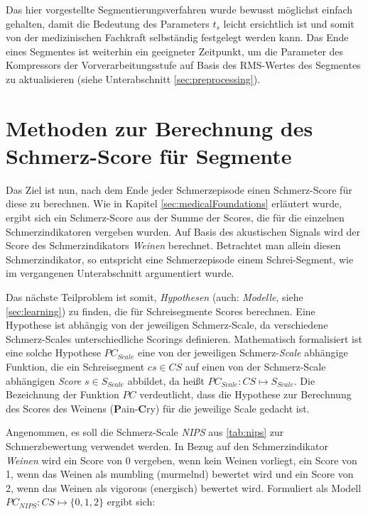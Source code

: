 Das hier vorgestellte Segmentierungsverfahren wurde bewusst möglichst einfach gehalten, damit die Bedeutung des Parameters $t_{s}$ leicht ersichtlich ist und somit von der medizinischen Fachkraft selbständig festgelegt werden kann. Das Ende eines Segmentes ist weiterhin ein geeigneter Zeitpunkt, um die Parameter des Kompressors der Vorverarbeitungsstufe auf Basis des RMS-Wertes des Segmentes zu aktualisieren (siehe Unterabschnitt  \ref{sec:preprocessing}).


\section{Methoden zur Berechnung des Schmerz-Score für Segmente}
\label{sec:overviewPainRegression}

Das Ziel ist nun, nach dem Ende jeder Schmerzepisode einen Schmerz-Score für diese zu berechnen. Wie in Kapitel \ref{sec:medicalFoundations} erläutert wurde, ergibt sich ein Schmerz-Score aus der Summe der Scores, die für die einzelnen Schmerzindikatoren vergeben wurden. Auf Basis des akustischen Signals wird der Score des Schmerzindikators \emph{Weinen} berechnet. Betrachtet man allein diesen Schmerzindikator, so entspricht eine Schmerzepisode einem Schrei-Segment, wie im vergangenen Unterabschnitt argumentiert wurde.

Das nächste Teilproblem ist somit, \emph{Hypothesen} (auch: \emph{Modelle}, siehe \autoref{sec:learning}) zu finden, die für Schreisegmente Scores berechnen. Eine Hypothese ist abhängig von der jeweiligen Schmerz-Scale, da verschiedene Schmerz-Scales unterschiedliche Scorings definieren. Mathematisch formalisiert ist eine solche Hypothese $PC_{Scale}$ eine von der jeweiligen Schmerz-\emph{Scale} abhängige Funktion, die ein Schreisegment $cs \in CS$ auf einen von der Schmerz-Scale abhängigen \emph{Score} $s \in S_{Scale}$ abbildet, da heißt $PC_{Scale}: CS \mapsto S_{Scale}$. Die Bezeichnung der Funktion $PC$ verdeutlicht, dass die Hypothese zur Berechnung des Scores des Weinens (\textbf{P}ain-\textbf{C}ry) für die jeweilige Scale gedacht ist.

Angenommen, es soll die Schmerz-Scale \emph{NIPS} aus \autoref{tab:nips} zur Schmerzbewertung verwendet werden. In Bezug auf den Schmerzindikator \emph{Weinen} wird ein Score von 0 vergeben, wenn kein Weinen vorliegt, ein Score von 1, wenn das Weinen als \glqq mumbling\grqq{} (murmelnd) bewertet wird und ein Score von 2, wenn das Weinen als \glqq vigorous\grqq{} (energisch) bewertet wird. Formuliert als Modell $PC_{NIPS}:CS \mapsto \{0, 1 , 2\}$ ergibt sich:


